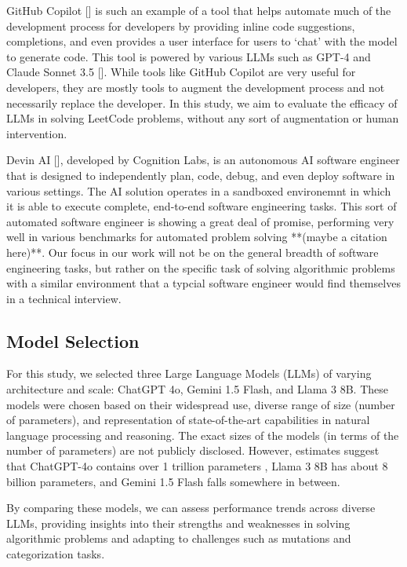 \documentclass[times, 10pt,twocolumn]{article}
\begin{document}
GitHub Copilot [] is such an example of a tool that helps automate much of the development process for developers by providing inline code suggestions, completions, and even provides a user interface for users to `chat' with the model to generate code. This tool is powered by various LLMs such as GPT-4 and Claude Sonnet 3.5 []. While tools like GitHub Copilot are very useful for developers, they are mostly tools to augment the development process and not necessarily replace the developer. In this study, we aim to evaluate the efficacy of LLMs in solving LeetCode problems, without any sort of augmentation or human intervention.

Devin AI [], developed by Cognition Labs, is an autonomous AI software engineer that is designed to independently plan, code, debug, and even deploy software in various settings. The AI solution operates in a sandboxed environemnt in which it is able to execute complete, end-to-end software engineering tasks. This sort of automated software engineer is showing a great deal of promise, performing very well in various benchmarks for automated problem solving **(maybe a citation here)**. Our focus in our work will not be on the general breadth of software engineering tasks, but rather on the specific task of solving algorithmic problems with a similar environment that a typcial software engineer would find themselves in a technical interview. 


\subsection{Model Selection}

For this study, we selected three Large Language Models (LLMs) of varying architecture and scale: ChatGPT 4o, Gemini 1.5 Flash, and Llama 3 8B. These models were chosen based on their widespread use, diverse range of size (number of parameters), and representation of state-of-the-art capabilities in natural language processing and reasoning. The exact sizes of the models (in terms of the number of parameters) are not publicly disclosed. However, estimates suggest that ChatGPT-4o contains over 1 trillion parameters \cite{Lacy_2024}, Llama 3 8B has about 8 billion parameters, and Gemini 1.5 Flash falls somewhere in between.

By comparing these models, we can assess performance trends across diverse LLMs, providing insights into their strengths and weaknesses in solving algorithmic problems and adapting to challenges such as mutations and categorization tasks.
\end{document}
